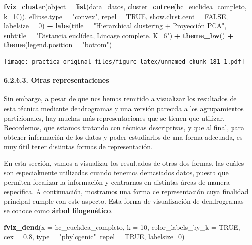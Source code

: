 \documentclass[spanish,]{article}
\newenvironment{Shaded}{\begin{snugshade}}{\end{snugshade}}
\newcommand{\KeywordTok}[1]{\textcolor[rgb]{0.13,0.29,0.53}{\textbf{#1}}}
\newcommand{\DataTypeTok}[1]{\textcolor[rgb]{0.13,0.29,0.53}{#1}}
\newcommand{\DecValTok}[1]{\textcolor[rgb]{0.00,0.00,0.81}{#1}}
\newcommand{\FloatTok}[1]{\textcolor[rgb]{0.00,0.00,0.81}{#1}}
\newcommand{\StringTok}[1]{\textcolor[rgb]{0.31,0.60,0.02}{#1}}
\newcommand{\OtherTok}[1]{\textcolor[rgb]{0.56,0.35,0.01}{#1}}
\newcommand{\OperatorTok}[1]{\textcolor[rgb]{0.81,0.36,0.00}{\textbf{#1}}}
\newcommand{\NormalTok}[1]{#1}
\let\oldparagraph\paragraph
\renewcommand{\paragraph}[1]{\oldparagraph{#1}\mbox{}}
\begin{document}
\begin{Shaded}
\begin{Highlighting}[]
\KeywordTok{fviz_cluster}\NormalTok{(}\DataTypeTok{object =} \KeywordTok{list}\NormalTok{(}\DataTypeTok{data=}\NormalTok{datos, }\DataTypeTok{cluster=}\KeywordTok{cutree}\NormalTok{(hc_euclidea_completo, }\DataTypeTok{k=}\DecValTok{10}\NormalTok{)),}
             \DataTypeTok{ellipse.type =} \StringTok{"convex"}\NormalTok{, }\DataTypeTok{repel =} \OtherTok{TRUE}\NormalTok{, }\DataTypeTok{show.clust.cent =} \OtherTok{FALSE}\NormalTok{,}
             \DataTypeTok{labelsize =} \DecValTok{0}\NormalTok{)  }\OperatorTok{+}
\StringTok{  }\KeywordTok{labs}\NormalTok{(}\DataTypeTok{title =} \StringTok{"Hierarchical clustering + Proyección PCA"}\NormalTok{,}
       \DataTypeTok{subtitle =} \StringTok{"Distancia euclídea, Lincage complete, K=6"}\NormalTok{) }\OperatorTok{+}
\StringTok{  }\KeywordTok{theme_bw}\NormalTok{() }\OperatorTok{+}
\StringTok{  }\KeywordTok{theme}\NormalTok{(}\DataTypeTok{legend.position =} \StringTok{"bottom"}\NormalTok{)}
\end{Highlighting}
\end{Shaded}

\texttt{[image: practica-original\_files/figure-latex/unnamed-chunk-181-1.pdf]}

\paragraph{6.2.6.3. Otras
representaciones}\label{otras-representaciones}

Sin embargo, a pesar de que nos hemos remitido a visualizar los
resultados de esta técnica mediante dendrogramas y una versión parecida
a los agrupamientos particionales, hay muchas más representaciones que
se tienen que utilizar. Recordemos, que estamos tratando con técnicas
descriptivas, y que al final, para obtener información de los datos y
poder estudiarlos de una forma adecuada, es muy útil tener distintas
formas de representación.

En esta sección, vamos a visualizar los resultados de otras dos formas,
las cuáles son especialmente utilizadas cuando tenemos demasiados datos,
puesto que permiten focalizar la información y centrarnos en distintas
áreas de manera específica. A continuación, mostramos una forma de
representación cuya finalidad principal cumple con este aspecto. Esta
forma de visualización de dendrogramas se conoce como \textbf{árbol
filogenético}.

\begin{Shaded}
\begin{Highlighting}[]
\KeywordTok{fviz_dend}\NormalTok{(}\DataTypeTok{x =}\NormalTok{ hc_euclidea_completo,}
          \DataTypeTok{k =} \DecValTok{10}\NormalTok{,}
          \DataTypeTok{color_labels_by_k =} \OtherTok{TRUE}\NormalTok{,}
          \DataTypeTok{cex =} \FloatTok{0.8}\NormalTok{,}
          \DataTypeTok{type =} \StringTok{"phylogenic"}\NormalTok{,}
          \DataTypeTok{repel =} \OtherTok{TRUE}\NormalTok{, }\DataTypeTok{labelsize=}\DecValTok{0}\NormalTok{)}
\end{Highlighting}
\end{Shaded}
\end{document}
